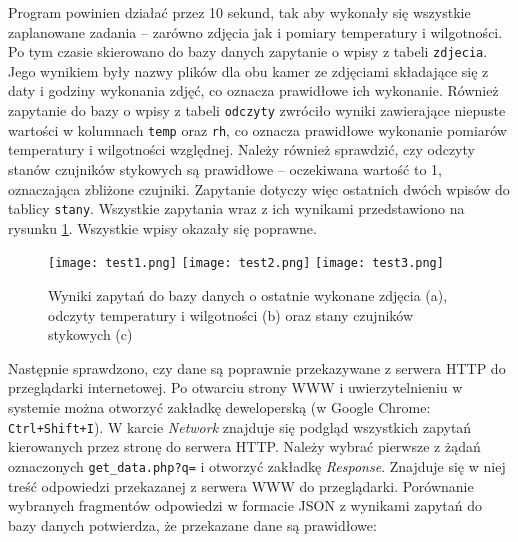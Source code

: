 \documentclass[a4paper,11pt,twoside]{article}
\begin{document}
Program powinien działać przez 10 sekund, tak aby wykonały się wszystkie zaplanowane zadania -- zarówno zdjęcia jak i pomiary temperatury i wilgotności. Po tym czasie skierowano do bazy danych zapytanie o wpisy z tabeli \texttt{zdjecia}. Jego wynikiem były nazwy plików dla obu kamer ze zdjęciami składające się z daty i godziny wykonania zdjęć, co oznacza prawidłowe ich wykonanie. Również zapytanie do bazy o wpisy z tabeli \texttt{odczyty} zwróciło wyniki zawierające niepuste wartości w kolumnach \texttt{temp} oraz \texttt{rh}, co oznacza prawidłowe wykonanie pomiarów temperatury i wilgotności względnej. Należy również sprawdzić, czy odczyty stanów czujników stykowych są prawidłowe -- oczekiwana wartość to 1, oznaczająca zbliżone czujniki. Zapytanie dotyczy więc ostatnich dwóch wpisów do tablicy \texttt{stany}. Wszystkie zapytania wraz z ich wynikami przedstawiono na rysunku \ref{fig: test1}. Wszystkie wpisy okazały się poprawne.
\begin{figure}
\begin{center}
\texttt{[image: test1.png]}
\texttt{[image: test2.png]}
\texttt{[image: test3.png]}
\caption{Wyniki zapytań do bazy danych o ostatnie wykonane zdjęcia (a), odczyty temperatury i wilgotności (b) oraz stany czujników stykowych (c)}
\label{fig: test1}
\end{center}
\end{figure}

Następnie sprawdzono, czy dane są poprawnie przekazywane z serwera HTTP do przeglądarki internetowej. Po otwarciu strony WWW i uwierzytelnieniu w systemie można otworzyć zakładkę deweloperską  
(w Google Chrome: \texttt{Ctrl+Shift+I}). W karcie \textit{Network} znajduje się podgląd wszystkich zapytań kierowanych przez stronę do serwera HTTP. Należy wybrać pierwsze z żądań oznaczonych \texttt{get{\_}data.php?q=} i otworzyć zakładkę \textit{Response}. Znajduje się w niej treść odpowiedzi przekazanej z serwera WWW do przeglądarki. Porównanie wybranych fragmentów odpowiedzi w formacie JSON z wynikami zapytań do bazy danych potwierdza, że przekazane dane są prawidłowe:
\end{document}
